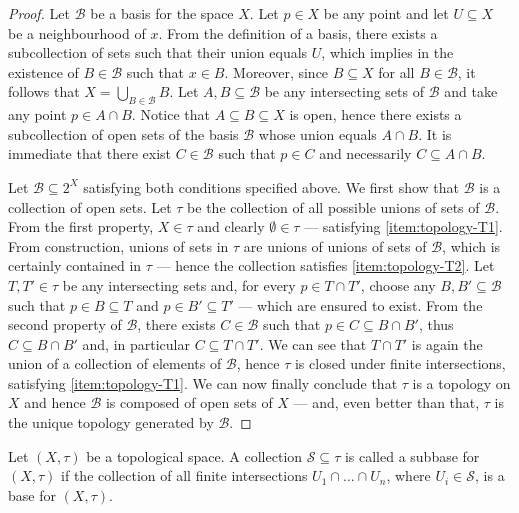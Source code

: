 \begin{proof}
    Let \(\mathcal{B}\) be a basis for the space \(X\). Let \(p \in X\) be any point
    and let \(U \subseteq X\) be a neighbourhood of \(x\). From the definition of a
    basis, there exists a subcollection of sets such that their union equals
    \(U\), which implies in the existence of \(B \in \mathcal B\) such that \(x \in
    B\). Moreover, since \(B \subseteq X\) for all \(B \in \mathcal B\), it follows
    that \(X = \bigcup_{B \in \mathcal B} B\). Let \(A, B \subseteq \mathcal B\) be
    any intersecting sets of \(\mathcal B\) and take any point \(p \in A \cap
    B\). Notice that \(A \subseteq B \subseteq X\) is open, hence there exists a
    subcollection of open sets of the basis \(\mathcal B\) whose union equals \(A
    \cap B\). It is immediate that there exist \(C \in \mathcal B\) such that \(p
    \in C\) and necessarily \(C \subseteq A \cap B\).

    Let \(\mathcal B \subseteq 2^X\) satisfying both conditions specified above. We
    first show that \(\mathcal B\) is a collection of open sets. Let \(\tau\)
    be the collection of all possible unions of sets of \(\mathcal B\). From the
    first property, \(X \in \tau\) and clearly \(\emptyset \in \tau\)
    --- satisfying \cref{item:topology-T1}. From construction, unions of sets in
    \(\tau\) are unions of unions of sets of \(\mathcal B\), which is
    certainly contained in \(\tau\) --- hence the collection satisfies
    \cref{item:topology-T2}. Let \(T, T' \in \tau\) be any intersecting sets
    and, for every \(p \in T \cap T'\), choose any \(B, B' \subseteq \mathcal B\)
    such that \(p \in B \subseteq T\) and \(p \in B' \subseteq T'\) --- which are
    ensured to exist. From the second property of \(\mathcal B\), there exists \(C
    \in \mathcal B\) such that \(p \in C \subseteq B \cap B'\), thus \(C \subseteq B
    \cap B'\) and, in particular \(C \subseteq T \cap T'\). We can see that \(T \cap
    T'\) is again the union of a collection of elements of \(\mathcal B\), hence
    \(\tau\) is closed under finite intersections, satisfying
    \cref{item:topology-T1}. We can now finally conclude that \(\tau\) is a
    topology on \(X\) and hence \(\mathcal B\) is composed of open sets of \(X\) ---
    and, even better than that, \(\tau\) is the unique topology generated by
    \(\mathcal B\).
\end{proof}

\begin{definition}[Subbase]\label{def: subbase}
    Let \((X, \tau)\) be a topological space. A collection \(\mathcal S
    \subseteq \tau\) is called a subbase for \((X, \tau)\) if the
    collection of all finite intersections \(U_1 \cap \dots \cap U_n\), where
    \(U_i \in \mathcal S\), is a base for \((X, \tau)\).
\end{definition}

